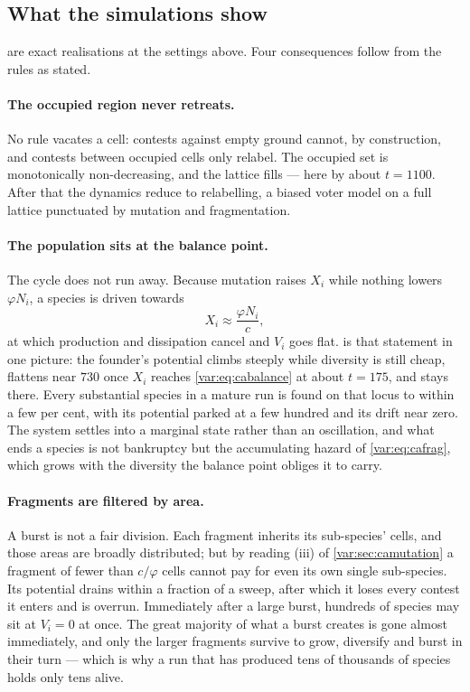 \subsection{What the simulations show}
\label{var:sec:caconsequences}

 are exact realisations at the
settings above. Four consequences follow from the rules as stated.

\paragraph*{The occupied region never retreats.} No rule vacates a cell:
contests against empty ground cannot, by construction, and contests between
occupied cells only relabel. The occupied set is monotonically
non-decreasing, and the lattice fills --- here by about $t=1100$. After that
the dynamics reduce to relabelling, a biased voter model on a full lattice
punctuated by mutation and fragmentation.

\paragraph*{The population sits at the balance point.} The cycle does not run
away. Because mutation raises $X_i$ while nothing lowers $\varphi N_i$, a
species is driven towards
\begin{equation}
X_i\approx\frac{\varphi N_i}{c},
\label{var:eq:cabalance}
\end{equation}
at which production and dissipation cancel and $V_i$ goes flat.
 is that statement in one picture: the founder's
potential climbs steeply while diversity is still cheap, flattens near $730$
once $X_i$ reaches \cref{var:eq:cabalance} at about $t=175$, and stays there.
Every substantial species in a mature run is found on that locus to within a
few per cent, with its potential parked at a few hundred and its drift near
zero. The system settles into a marginal state rather than an oscillation,
and what ends a species is not bankruptcy but the accumulating hazard of
\cref{var:eq:cafrag}, which grows with the diversity the balance point
obliges it to carry.

\paragraph*{Fragments are filtered by area.} A burst is not a fair division.
Each fragment inherits its sub-species' cells, and those areas are broadly
distributed; but by reading (iii) of \cref{var:sec:camutation} a fragment of
fewer than $c/\varphi$ cells cannot pay for even its own single sub-species.
Its potential drains within a fraction of a sweep, after which it loses every
contest it enters and is overrun. Immediately after a large burst, hundreds
of species may sit at $V_i=0$ at once. The great majority of what a burst
creates is gone almost immediately, and only the larger fragments survive to
grow, diversify and burst in their turn --- which is why a run that has
produced tens of thousands of species holds only tens alive.

